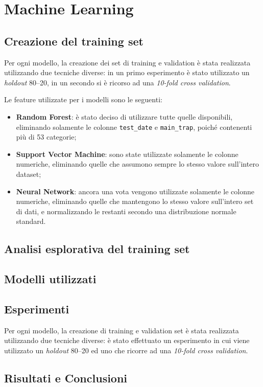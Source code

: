 \setcounter{chapter}{0}
\part{Machine Learning}
\chapter{Creazione del training set}
Per ogni modello, la creazione dei set di training e validation è stata 
realizzata utilizzando due tecniche diverse: in un primo esperimento è stato 
utilizzato un \textit{holdout} 80--20, in un secondo si è ricorso ad una 
\textit{10-fold cross validation}.

Le feature utilizzate per i modelli sono le seguenti:
\begin{itemize}
	\item \textbf{Random Forest}: è stato deciso di utilizzare tutte quelle 
	disponibili, eliminando solamente le colonne \texttt{test\_date} e 
	\texttt{main\_trap}, poiché contenenti più di 53 categorie;
	\item \textbf{Support Vector Machine}: sono state utilizzate solamente le 
	colonne numeriche, eliminando quelle che assumono sempre lo stesso 
	valore sull'intero dataset;
	\item \textbf{Neural Network}: ancora una vota vengono utilizzate solamente 
	le colonne numeriche, eliminando quelle che mantengono lo stesso valore 
	sull'intero set di dati, e	normalizzando le restanti secondo una 
	distribuzione normale standard.
\end{itemize} 

\chapter{Analisi esplorativa del training set}
\label{chap:analisi-training}

\chapter{Modelli utilizzati}


\chapter{Esperimenti}
Per ogni modello, la creazione di training e validation set è stata realizzata 
utilizzando due tecniche diverse: è stato effettuato un esperimento in cui 
viene utilizzato un \textit{holdout} 80--20 ed uno che ricorre ad una 
\textit{10-fold cross validation}.


\chapter{Risultati e Conclusioni}
